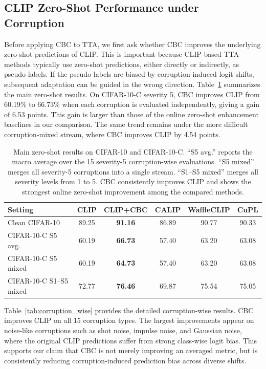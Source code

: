 \subsection{CLIP Zero-Shot Performance under Corruption}
\label{subsec:zero_shot_corruption}

Before applying CBC to TTA, we first ask whether CBC improves the underlying zero-shot predictions of CLIP.
This is important because CLIP-based TTA methods typically use zero-shot predictions, either directly or indirectly, as pseudo labels.
If the pseudo labels are biased by corruption-induced logit shifts, subsequent adaptation can be guided in the wrong direction.
Table~\ref{tab:main_zero_shot} summarizes the main zero-shot results.
On CIFAR-10-C severity 5, CBC improves CLIP from 60.19\% to 66.73\% when each corruption is evaluated independently, giving a gain of 6.53 points.
This gain is larger than those of the online zero-shot enhancement baselines in our comparison.
The same trend remains under the more difficult corruption-mixed stream, where CBC improves CLIP by 4.54 points.

\begin{table}[t]
\centering
\caption{Main zero-shot results on CIFAR-10 and CIFAR-10-C. ``S5 avg.'' reports the macro average over the 15 severity-5 corruption-wise evaluations. ``S5 mixed'' merges all severity-5 corruptions into a single stream. ``S1--S5 mixed'' merges all severity levels from 1 to 5. CBC consistently improves CLIP and shows the strongest online zero-shot improvement among the compared methods.}
\label{tab:main_zero_shot}
\small
\setlength{\tabcolsep}{5pt}
\begin{tabular}{lccccc}
\toprule
\textbf{Setting} & \textbf{CLIP} & \textbf{CLIP+CBC} & \textbf{CALIP} & \textbf{WaffleCLIP} & \textbf{CuPL} \\
\midrule
Clean CIFAR-10 & 89.25 & \textbf{91.16} & 86.89 & 90.77 & 90.33 \\
CIFAR-10-C S5 avg. & 60.19 & \textbf{66.73} & 57.40 & 63.20 & 63.08 \\
CIFAR-10-C S5 mixed & 60.19 & \textbf{64.73} & 57.40 & 63.20 & 63.08 \\
CIFAR-10-C S1--S5 mixed & 72.77 & \textbf{76.46} & 69.87 & 75.54 & 75.05 \\
\bottomrule
\end{tabular}
\end{table}

Table~\ref{tab:corruption_wise} provides the detailed corruption-wise results.
CBC improves CLIP on all 15 corruption types.
The largest improvements appear on noise-like corruptions such as shot noise, impulse noise, and Gaussian noise, where the original CLIP predictions suffer from strong class-wise logit bias.
This supports our claim that CBC is not merely improving an averaged metric, but is consistently reducing corruption-induced prediction bias across diverse shifts.

